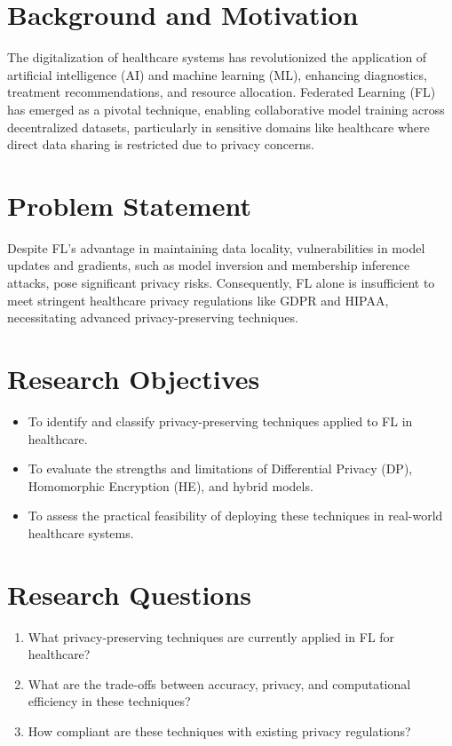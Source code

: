 \documentclass[12pt]{report}
\begin{document}
\section{Background and Motivation}
The digitalization of healthcare systems has revolutionized the application of artificial intelligence (AI) and machine learning (ML), enhancing diagnostics, treatment recommendations, and resource allocation. Federated Learning (FL) has emerged as a pivotal technique, enabling collaborative model training across decentralized datasets, particularly in sensitive domains like healthcare where direct data sharing is restricted due to privacy concerns.

\section{Problem Statement}
Despite FL's advantage in maintaining data locality, vulnerabilities in model updates and gradients, such as model inversion and membership inference attacks, pose significant privacy risks. Consequently, FL alone is insufficient to meet stringent healthcare privacy regulations like GDPR and HIPAA, necessitating advanced privacy-preserving techniques.

\section{Research Objectives}
\begin{itemize}
    \item To identify and classify privacy-preserving techniques applied to FL in healthcare.
    \item To evaluate the strengths and limitations of Differential Privacy (DP), Homomorphic Encryption (HE), and hybrid models.
    \item To assess the practical feasibility of deploying these techniques in real-world healthcare systems.
\end{itemize}

\section{Research Questions}
\begin{enumerate}
    \item What privacy-preserving techniques are currently applied in FL for healthcare?
    \item What are the trade-offs between accuracy, privacy, and computational efficiency in these techniques?
    \item How compliant are these techniques with existing privacy regulations?
\end{enumerate}
\end{document}
